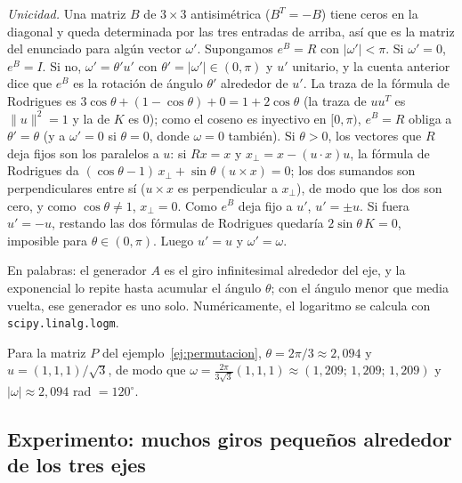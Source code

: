 \begin{demostracion}
\emph{Unicidad.} Una matriz \(B\) de \(3\times3\) antisimétrica (\(B^T=-B\)) tiene ceros en la
diagonal y queda determinada por las tres entradas de arriba, así que es la matriz del
enunciado para algún vector \(\omega'\). Supongamos \(e^B=R\) con \(|\omega'|<\pi\). Si
\(\omega'=0\), \(e^B=I\). Si no, \(\omega'=\theta'u'\) con \(\theta'=|\omega'|\in(0,\pi)\) y
\(u'\) unitario, y la cuenta anterior dice que \(e^B\) es la rotación de ángulo \(\theta'\)
alrededor de \(u'\). La traza de la fórmula de Rodrigues es
\(3\cos\theta+(1-\cos\theta)+0=1+2\cos\theta\) (la traza de \(uu^T\) es \(\|u\|^2=1\) y la de
\(K\) es \(0\)); como el coseno es inyectivo en \([0,\pi)\), \(e^B=R\) obliga a
\(\theta'=\theta\) (y a \(\omega'=0\) si \(\theta=0\), donde \(\omega=0\) también). Si
\(\theta>0\), los vectores que \(R\) deja fijos son los paralelos a \(u\): si \(Rx=x\) y
\(x_\perp=x-(u\cdot x)u\), la fórmula de Rodrigues da \((\cos\theta-1)\,x_\perp+\sin\theta\,(u\times x)=0\);
los dos sumandos son perpendiculares entre sí (\(u\times x\) es perpendicular a \(x_\perp\)),
de modo que los dos son cero, y como \(\cos\theta\neq1\), \(x_\perp=0\). Como \(e^B\) deja fijo
a \(u'\), \(u'=\pm u\). Si fuera \(u'=-u\), restando las dos fórmulas de Rodrigues quedaría
\(2\sin\theta\,K=0\), imposible para \(\theta\in(0,\pi)\). Luego \(u'=u\) y \(\omega'=\omega\).
\end{demostracion}

En palabras: el generador \(A\) es el giro infinitesimal alrededor del eje, y la exponencial
lo repite hasta acumular el ángulo \(\theta\); con el ángulo menor que media vuelta, ese
generador es uno solo. Numéricamente, el logaritmo se calcula con
\texttt{scipy.linalg.logm}.

\begin{ejemplo}
Para la matriz \(P\) del ejemplo~\ref{ej:permutacion}, \(\theta=2\pi/3\approx2{,}094\) y
\(u=(1,1,1)/\sqrt3\), de modo que
\(\omega=\tfrac{2\pi}{3\sqrt3}(1,1,1)\approx(1{,}209;\,1{,}209;\,1{,}209)\) y
\(|\omega|\approx2{,}094\) rad \(=120^\circ\).
\end{ejemplo}

\subsection{Experimento: muchos giros pequeños alrededor de los tres ejes}

